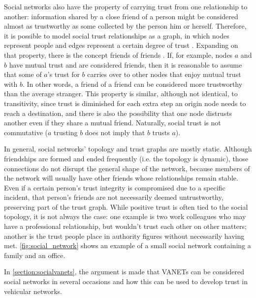 
Social networks also have the property of carrying trust from one relationship to another:
information shared by a close friend of a person might be considered almost as trustworthy as some collected by the person him or herself.
Therefore, it is possible to model social trust relationships as a graph, in which nodes represent people and edges represent a certain degree of trust \citep{newmannetworks}.
Expanding on that property, there is the concept friends of friends \citep{boissevain1974friends}.
If, for example, nodes $a$ and $b$ have mutual trust and are considered friends, then it is reasonable to assume that some of $a$'s trust for $b$ carries over to other nodes that enjoy mutual trust with $b$.
In other words, a friend of a friend can be considered more trustworthy than the average stranger.
This property is similar, although not identical, to transitivity, since trust is diminished for each extra step an origin node needs to reach a destination, and there is also the possibility that one node distrusts another even if they share a mutual friend.
Naturally, social trust is not commutative ($a$ trusting $b$ does not imply that $b$ trusts $a$).

In general, social networks' topology and trust graphs are mostly static.
Although friendships are formed and ended frequently (i.e. the topology is dynamic), those connections do not disrupt the general shape of the network, because members of the network will usually have other friends whose relationships remain stable.
Even if a certain person's trust integrity is compromised due to a specific incident, that person's friends are not necessarily deemed untrustworthy, preserving part of the trust graph.
While positive trust is often tied to the social topology, it is not always the case: one example is two work colleagues who may have a professional relationship, but wouldn't trust each other on other matters; another is the trust people place in authority figures without necessarily having met. 
\autoref{fig:social_network} shows an example of a small social network containing a family and an office. 

In \autoref{section:socialvanets}, the argument is made that VANETs can be considered social networks in several occasions and how this can be used to develop trust in vehicular networks. 


